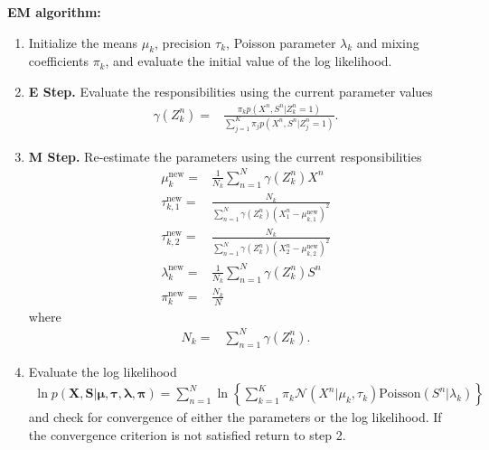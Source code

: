 \documentclass[11pt]{extarticle}
\newcommand{\N}{\mathcal{N}}
\newcommand{\X}{\mathbf{X}}
\newcommand{\0}{\mathbf{0}}
\renewcommand{\(}{\left(}
\renewcommand{\)}{\right)}
\theoremstyle{definition}
\begin{document}
\par \textbf{EM algorithm:}
\begin{enumerate}
	\item Initialize the means $\mu_{k}$, precision $\tau_{k}$, Poisson parameter $\lambda_{k}$ and mixing coefficients $\pi_{k}$, and evaluate the initial value of the log likelihood.
	\item \textbf{E Step.} Evaluate the responsibilities using the current parameter values
	\begin{align*}
		\gamma(Z^{n}_{k}) =& \frac{\pi_{k} p(X^{n}, S^{n} \vert Z^{n}_{k} = 1)}{\sum_{j=1}^{K}\pi_{j} p(X^{n}, S^{n} \vert Z^{n}_{j}=1)}.
	\end{align*}
	\item \textbf{M Step.} Re-estimate the parameters using the current responsibilities
	\begin{align*}
		\mu_{k}^{\mathrm{new}} =& \frac{1}{N_{k}} \sum_{n=1}^{N} \gamma(Z^{n}_{k}) X^{n} \\
		\tau_{k,1}^{\mathrm{new}} =& \frac{N_{k}}{\sum_{n=1}^{N} \gamma(Z^{n}_{k}) (X^{n}_{1} - \mu_{k,1}^{\mathrm{new}})^{2}} \\
		\tau_{k,2}^{\mathrm{new}} =& \frac{N_{k}}{\sum_{n=1}^{N} \gamma(Z^{n}_{k}) (X^{n}_{2} - \mu_{k,2}^{\mathrm{new}})^{2}} \\
		\lambda_{k}^{\mathrm{new}} =& \frac{1}{N_{k}} \sum_{n=1}^{N} \gamma(Z^{n}_{k}) S^{n} \\
		\pi_{k}^{\mathrm{new}} =& \frac{N_{k}}{N}
	\end{align*}
	where
	\begin{align*}
		N_{k} =& \sum_{n=1}^{N} \gamma(Z^{n}_{k}).
	\end{align*}
	\item Evaluate the log likelihood
	\begin{align*}
		\ln p(\X, \mathbf{S} \vert \bm{\mu}, \bm{\tau}, \bm{\lambda}, \bm{\pi}) = \sum_{n=1}^{N} \ln\left\{ \sum_{k=1}^{K} \pi_{k}\N(X^{n} \vert \mu_{k}, \tau_{k})\mathrm{Poisson}(S^{n} \vert \lambda_{k}) \right\}
	\end{align*}
	and check for convergence of either the parameters or the log likelihood. If the convergence criterion is not satisfied return to step 2.
\end{enumerate}


\noindent{} \\

\end{document}
